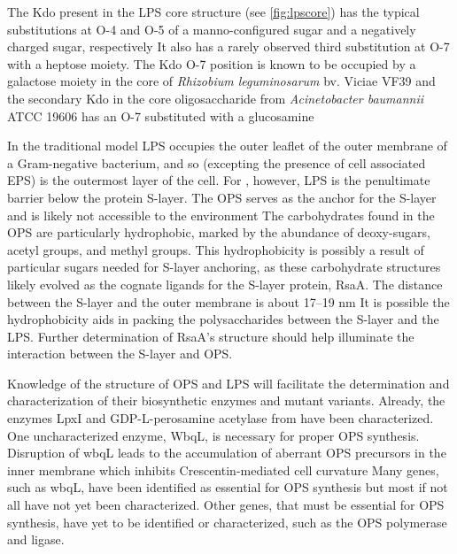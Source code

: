 The Kdo present in the \ac{LPS} core structure (see \cref{fig:lpscore}) has the typical
substitutions at O-4 and O-5 of a manno-configured sugar and a negatively charged sugar,
respectively It also has a rarely observed third substitution at O-7 with a
heptose moiety. The Kdo O-7 position is known to be occupied by a galactose moiety in the core of
\textit{Rhizobium leguminosarum} bv. Viciae VF39 and the secondary Kdo in
the core oligosaccharide from \textit{Acinetobacter baumannii} ATCC 19606 has an O-7 substituted
with a glucosamine

In the traditional model \ac{LPS} occupies the outer leaflet of the outer membrane of a
Gram-negative bacterium, and so (excepting the presence of cell associated \ac{EPS}) is the
outermost layer of the cell. For \caulobacter, however, \ac{LPS} is the penultimate barrier below
the protein \ac{S-layer}. The \caulobacter{} \ac{OPS} serves as the anchor for the S-layer and is
likely not accessible to the environment The carbohydrates found in the \ac{OPS}
are particularly hydrophobic, marked by the abundance of deoxy-sugars, acetyl groups, and methyl
groups. This hydrophobicity is possibly a result of particular sugars needed for \ac{S-layer}
anchoring, as these carbohydrate structures likely evolved as the cognate ligands for the
\ac{S-layer} protein, RsaA. The distance between the \ac{S-layer} and the outer membrane is about
17--19 nm It is possible the hydrophobicity aids in packing the polysaccharides
between the S-layer and the \ac{LPS}. Further determination of RsaA's structure should help
illuminate the interaction between the S-layer and \ac{OPS}.

Knowledge of the structure of \caulobacter{} \ac{OPS} and \ac{LPS} will facilitate the determination
and characterization of their biosynthetic enzymes and mutant variants. Already, the enzymes
LpxI and GDP-L-perosamine acetylase from
\caulobacter have been characterized. One uncharacterized enzyme, WbqL, is necessary for proper
\ac{OPS} synthesis. Disruption of wbqL leads to the accumulation of aberrant \ac{OPS} precursors in the inner membrane which inhibits Crescentin-mediated cell
curvature Many genes, such as wbqL, have been identified as
essential for \ac{OPS} synthesis but most if not all have not yet been characterized. Other genes, that must be essential for \ac{OPS} synthesis, have yet to be identified or characterized,
such as the \ac{OPS} polymerase and ligase.

